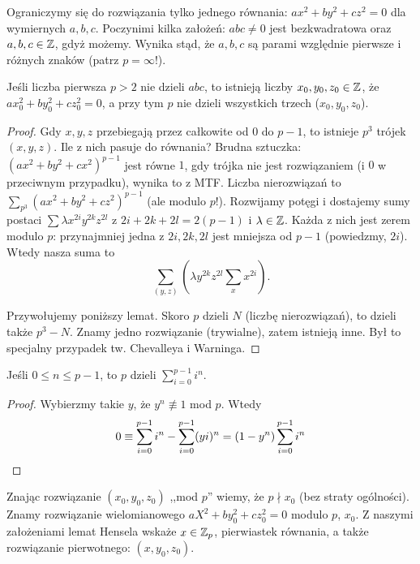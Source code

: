 Ograniczymy się do rozwiązania tylko jednego równania: $ax^2 + by^2 + cz^2 = 0$ dla wymiernych $a, b,c $.
Poczynimi kilka założeń: $abc \neq 0$ jest bezkwadratowa oraz $a,b,c \in \mathbb Z$, gdyż możemy.
Wynika stąd, że $a,b,c$ są parami względnie pierwsze i różnych znaków (patrz $p= \infty$!).

\begin{fakt}
	Jeśli liczba pierwsza $p > 2$ nie dzieli $abc$, to istnieją liczby $x_0, y_0, z_0 \in \mathbb Z$, że $ax_0^2 + by_0^2 + cz_0^2 = 0$, a przy tym $p$ nie dzieli wszystkich trzech ($x_0, y_0, z_0$).
\end{fakt}

\begin{proof} %
	Gdy $x, y, z$ przebiegają przez całkowite od $0$ do $p-1$, to istnieje $p^3$ trójek $(x,y,z)$.
	Ile z nich pasuje do równania?
	Brudna sztuczka: $(ax^2+by^2+cx^2)^{p-1}$ jest równe $1$, gdy trójka nie jest rozwiązaniem (i $0$ w przeciwnym przypadku), wynika to z MTF.
	Liczba nierozwiązań to $\sum_{p^3} (ax^2+by^2+cz^2)^{p-1}$ (ale modulo $p$!).
	Rozwijamy potęgi i dostajemy sumy postaci $\sum \lambda x^{2i}y^{2k}z^{2l}$ z $2i+2k+2l = 2(p-1)$ i $\lambda \in \mathbb Z$.
	Każda z nich jest zerem modulo $p$: 
	przynajmniej jedna z $2i, 2k, 2l$ jest mniejsza od $p-1$ (powiedzmy, $2i$).
	Wtedy nasza suma to
	\[
		\sum_{(y,z)} \left(\lambda y^{2k}z^{2l} \sum_{x} x^{2i}\right).
	\]

	Przywołujemy poniższy lemat.
	Skoro $p$ dzieli $N$ (liczbę nierozwiązań), to dzieli także $p^3 - N$.
	Znamy jedno rozwiązanie (trywialne), zatem istnieją inne.
	Był to specjalny przypadek tw. Chevalleya i Warninga.
\end{proof}

\begin{lemat}
	Jeśli $0 \le n \le p-1$, to $p$ dzieli $\sum_{i=0}^{p-1} i^n$.
\end{lemat}

\begin{proof}
Wybierzmy takie $y$, że $y^n \not\equiv 1$ mod $p$.
Wtedy
\[
	0 \equiv \sum_{i=0}^{p-1} i^n - \sum_{i=0}^{p-1} (yi)^n = (1-y^n) \sum_{i = 0}^{p-1} i^n \qedhere
\]
\end{proof}

Znając rozwiązanie $(x_0,y_0, z_0)$ ,,mod $p$'' wiemy, że $p \nmid x_0$ (bez straty ogólności).
Znamy rozwiązanie wielomianowego $aX^2 + by_0^2 + cz_0^2 = 0$ modulo $p$, $x_0$.
Z naszymi założeniami lemat Hensela wskaże $x \in \mathbb Z_p$, pierwiastek równania, a także rozwiązanie pierwotnego: $(x, y_0, z_0)$.

